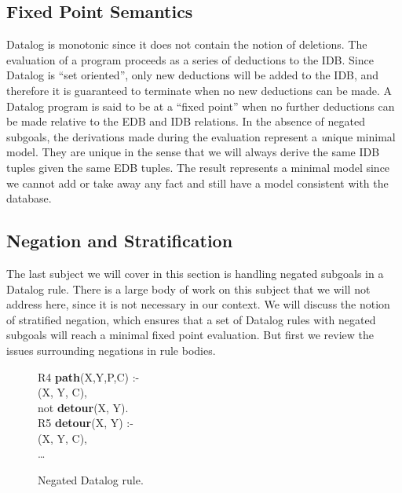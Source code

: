 \subsection{Fixed Point Semantics}

Datalog is monotonic since it does not contain the notion of deletions.  The
evaluation of a program proceeds as a series of deductions to the IDB.  Since
Datalog is ``set oriented'', only new deductions will be added to the IDB, and
therefore it is guaranteed to terminate when no new deductions can be made.  A
Datalog program is said to be at a ``fixed point'' when no further deductions
can be made relative to the EDB and IDB relations.  In the absence of negated
subgoals, the derivations made during the evaluation represent a {\emph unique
minimal model}.  They are unique in the sense that we will always derive the
same IDB tuples given the same EDB tuples.  The result represents a minimal
model since we cannot add or take away any fact and still have a model
consistent with the database.

\subsection{Negation and Stratification}

The last subject we will cover in this section is handling negated
subgoals in a Datalog rule. There is a large body of work on this subject
that we will not address here, since it is not necessary in our context.
We will discuss the notion of stratified negation, which ensures that
a set of Datalog rules with negated subgoals will reach a minimal fixed point
evaluation. But first we review the issues surrounding negations in rule
bodies.

\begin{figure}
\centering
\ssp
\begin{boxedminipage}{\linewidth}
R4 {\bf path}(X,Y,P,C) :- \\
(X, Y, C), \\
\datalogspace not {\bf detour}(X, Y). \\

R5 {\bf detour}(X, Y) :- \\
(X, Y, C), \\
\datalogspace \ldots 
\end{boxedminipage}
\caption{\label{ch:p2:fig:negation}Negated Datalog rule.}
\end{figure}

